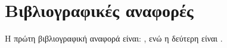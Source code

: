 \section{Βιβλιογραφικές αναφορές}
H πρώτη βιβλιογραφική αναφορά είναι: \cite{pdf-license}, ενώ η δεύτερη είναι \parencite{europe-copyright}.

\printbibliography[title={Βιβλιογραφία}]
